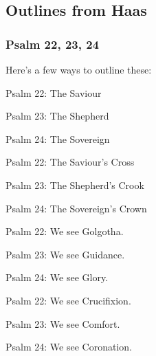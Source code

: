 \subsection{Outlines from Haas}

\subsubsection{Psalm 22, 23, 24}

Here's a few ways to outline these:\\
\begin{compactenum}[I.][19]
    \item Psalm 22: The Saviour
    \item Psalm 23:  The Shepherd
    \item Psalm 24:  The Sovereign\\
\end{compactenum}
\begin{compactenum}[I.][19]
    \item Psalm 22: The Saviour's Cross
    \item Psalm 23:  The Shepherd's Crook
    \item Psalm 24:  The Sovereign's Crown\\
\end{compactenum}
\begin{compactenum}[I.][19]
    \item Psalm 22: We see Golgotha.
    \item Psalm 23:  We see Guidance.
    \item Psalm 24:  We see Glory.\\
\end{compactenum}
\begin{compactenum}[I.][19]
    \item Psalm 22:  We see Crucifixion.
    \item Psalm 23:  We see Comfort.
    \item Psalm 24:  We see Coronation.\\
\end{compactenum}

